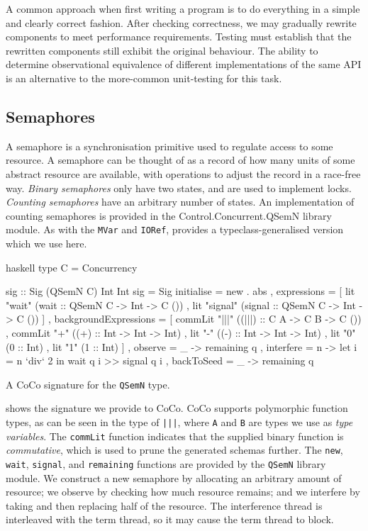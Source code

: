 A common approach when first writing a program is to do everything in
a simple and clearly correct fashion.  After checking correctness, we
may gradually rewrite components to meet performance requirements.
Testing must establish that the rewritten components still exhibit the
original behaviour.  The ability to determine observational
equivalence of different implementations of the same API is an
alternative to the more-common unit-testing for this
task\cite{he1986}.

\subsection{Semaphores}
\label{sec:coco-cases-semaphore}

A semaphore is a synchronisation primitive used to regulate access to
some resource\cite{ewd123}.  A semaphore can be thought of as a record
of how many units of some abstract resource are available, with
operations to adjust the record in a race-free way.  \emph{Binary
  semaphores} only have two states, and are used to implement
locks. \emph{Counting semaphores} have an arbitrary number of states.
An implementation of counting semaphores is provided in the
Control.Concurrent.QSemN library module.  As with the \verb|MVar| and
\verb|IORef|, \dejafu{} provides a typeclass-generalised version which
we use here.

\begin{listing}
\centering
\begin{cminted}{haskell}
type C = Concurrency

sig :: Sig (QSemN C) Int Int
sig = Sig
  { initialise = new . abs
  , expressions =
    [ lit "wait"   (wait   :: QSemN C -> Int -> C ())
    , lit "signal" (signal :: QSemN C -> Int -> C ())
    ]
  , backgroundExpressions =
    [ commLit "|||" ((|||) :: C A -> C B -> C ())
    , commLit "+"   ((+)   :: Int -> Int -> Int)
    , lit "-"       ((-)   :: Int -> Int -> Int)
    , lit "0" (0 :: Int)
    , lit "1" (1 :: Int)
    ]
  , observe    = \q _ -> remaining q
  , interfere  = \q n -> let i = n `div` 2 in wait q i >> signal q i
  , backToSeed = \q _ -> remaining q
  }
\end{cminted}
\caption{A CoCo signature for the \texttt{QSemN} type.}
\label{lst:sig}
\end{listing}

 shows the signature we provide to CoCo.  CoCo supports
polymorphic function types, as can be seen in the type of \verb#|||#,
where \verb|A| and \verb|B| are types we use as \emph{type variables}.
The \verb|commLit| function indicates that the supplied binary
function is \emph{commutative}, which is used to prune the generated
schemas further.  The \verb|new|, \verb|wait|, \verb|signal|, and
\verb|remaining| functions are provided by the \verb|QSemN| library
module.  We construct a new semaphore by allocating an arbitrary
amount of resource; we observe by checking how much resource remains;
and we interfere by taking and then replacing half of the resource.
The interference thread is interleaved with the term thread, so it may
cause the term thread to block.


